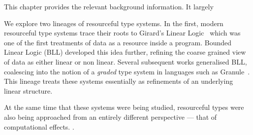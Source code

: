 This chapter provides the relevant background information. It largely



We explore two lineages of resourceful type systems. In the first, modern
resourceful type systems trace their roots to Girard's Linear Logic~\cite{}
which was one of the first treatments of data as a resource inside a program. Bounded Linear Logic (BLL)
developed this idea further, refining the coarse grained view of data as either
linear or non linear. Several subsequent works generalised BLL, coalescing into
the notion of a \textit{graded} type system in languages such as
Granule~\cite{}. This lineage treats these systems essentially as refinements of an
underlying linear structure.

At the same time that these systems were being studied, resourceful types were
also being approached from an entirely different perspective --- that of
computational effects. .

